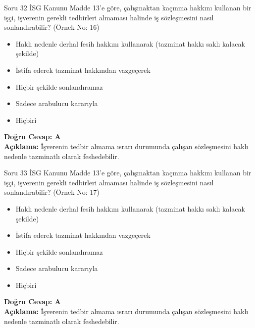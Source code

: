 \documentclass[12pt,a4paper]{article}
\begin{document}
\begin{testcard}{Soru 32}
    İSG Kanunu Madde 13'e göre, çalışmaktan kaçınma hakkını kullanan bir işçi, işverenin gerekli tedbirleri almaması halinde iş sözleşmesini nasıl sonlandırabilir? (Örnek No: 16)
    \begin{itemize}
        \item[A)] Haklı nedenle derhal fesih hakkını kullanarak (tazminat hakkı saklı kalacak şekilde)
        \item[B)] İstifa ederek tazminat hakkından vazgeçerek
        \item[C)] Hiçbir şekilde sonlandıramaz
        \item[D)] Sadece arabulucu kararıyla
        \item[E)] Hiçbiri
    \end{itemize}
    \tcblower
    \textbf{Doğru Cevap: A} \\
    \textbf{Açıklama:} İşverenin tedbir almama ısrarı durumunda çalışan sözleşmesini haklı nedenle tazminatlı olarak feshedebilir.
\end{testcard}

\begin{testcard}{Soru 33}
    İSG Kanunu Madde 13'e göre, çalışmaktan kaçınma hakkını kullanan bir işçi, işverenin gerekli tedbirleri almaması halinde iş sözleşmesini nasıl sonlandırabilir? (Örnek No: 17)
    \begin{itemize}
        \item[A)] Haklı nedenle derhal fesih hakkını kullanarak (tazminat hakkı saklı kalacak şekilde)
        \item[B)] İstifa ederek tazminat hakkından vazgeçerek
        \item[C)] Hiçbir şekilde sonlandıramaz
        \item[D)] Sadece arabulucu kararıyla
        \item[E)] Hiçbiri
    \end{itemize}
    \tcblower
    \textbf{Doğru Cevap: A} \\
    \textbf{Açıklama:} İşverenin tedbir almama ısrarı durumunda çalışan sözleşmesini haklı nedenle tazminatlı olarak feshedebilir.
\end{testcard}
\end{document}
